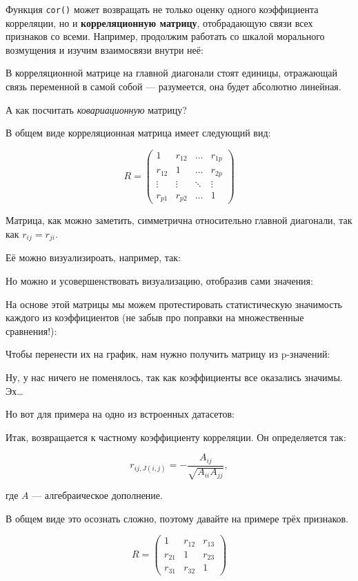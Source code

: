 \documentclass[
  letterpaper,
  DIV=11,
  numbers=noendperiod]{scrreprt}
\theoremstyle{definition}
\theoremstyle{remark}
\begin{document}
Функция \texttt{cor()} может возвращать не только оценку одного
коэффициента корреляции, но и \textbf{корреляционную матрицу},
отобрадающую связи всех признаков со всеми. Например, продолжим работать
со шкалой морального возмущения и изучим взаимосвязи внутри неё:

В корреляционной матрице на главной диагонали стоят единицы, отражающай
связь переменной в самой собой --- разумеется, она будет абсолютно
линейная.

А как посчитать \emph{ковариационную} матрицу?

В общем виде корреляционная матрица имеет следующий вид:

\[
R = 
\begin{pmatrix}
1 & r_{12} & \dots & r_{1p} \\
r_{12} & 1 & \dots & r_{2p} \\
\vdots & \vdots & \ddots & \vdots \\
r_{p1} & r_{p2} & \dots & 1
\end{pmatrix}
\]

Матрица, как можно заметить, симметрична относительно главной диагонали,
так как \(r_{ij} = r_{ji}\).

Её можно визуализироать, например, так:

Но можно и усовершенствовать визуализацию, отобразив сами значения:

На основе этой матрицы мы можем протестировать статистическую значимость
каждого из коэффициентов (не забыв про поправки на множественные
сравнения!):

Чтобы перенести их на график, нам нужно получить матрицу из p-значений:

Ну, у нас ничего не поменялось, так как коэффициенты все оказались
значимы. Эх\ldots{}

Но вот для примера на одно из встроенных датасетов:

Итак, возвращается к частному коэффициенту корреляции. Он определяется
так:

\[
r_{ij, J(i,j)} = - \frac{A_{ij}}{\sqrt{A_{ii} A_{jj}}},
\]

где \(A\) --- алгебраическое дополнение.

В общем виде это осознать сложно, поэтому давайте на примере трёх
признаков.

\[
R =
\begin{pmatrix}
1 & r_{12} & r_{13} \\
r_{21} & 1 & r_{23} \\
r_{31} & r_{32} & 1
\end{pmatrix}
\]
\end{document}
